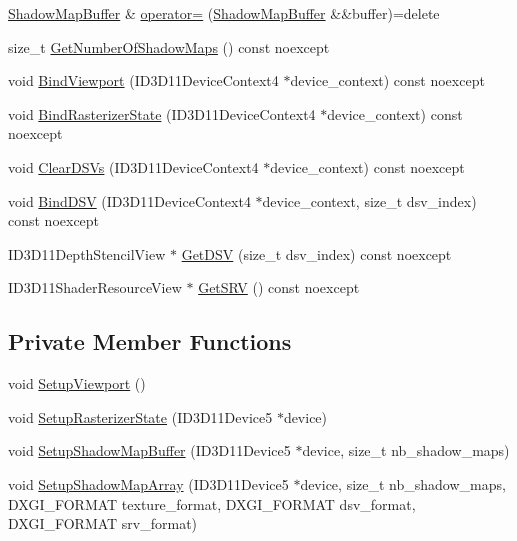 \begin{DoxyCompactItemize}
\item 
\hyperlink{structmage_1_1_shadow_map_buffer}{Shadow\+Map\+Buffer} \& \hyperlink{structmage_1_1_shadow_map_buffer_a7ecdf05195a56dbbfbe473df2aad6ba6}{operator=} (\hyperlink{structmage_1_1_shadow_map_buffer}{Shadow\+Map\+Buffer} \&\&buffer)=delete
\item 
size\+\_\+t \hyperlink{structmage_1_1_shadow_map_buffer_ab0b78c26663aa303d8f72dc89ec25eea}{Get\+Number\+Of\+Shadow\+Maps} () const noexcept
\item 
void \hyperlink{structmage_1_1_shadow_map_buffer_ae0d097c959ff2cdb2aabdd246c654039}{Bind\+Viewport} (I\+D3\+D11\+Device\+Context4 $\ast$device\+\_\+context) const noexcept
\item 
void \hyperlink{structmage_1_1_shadow_map_buffer_a4f71a1a486049ab2455af83f6a4c0f28}{Bind\+Rasterizer\+State} (I\+D3\+D11\+Device\+Context4 $\ast$device\+\_\+context) const noexcept
\item 
void \hyperlink{structmage_1_1_shadow_map_buffer_ac2e03bb5d33f5014d9ef66df401308d9}{Clear\+D\+S\+Vs} (I\+D3\+D11\+Device\+Context4 $\ast$device\+\_\+context) const noexcept
\item 
void \hyperlink{structmage_1_1_shadow_map_buffer_a8e23dccfa670bdb4a698977b7524434e}{Bind\+D\+SV} (I\+D3\+D11\+Device\+Context4 $\ast$device\+\_\+context, size\+\_\+t dsv\+\_\+index) const noexcept
\item 
I\+D3\+D11\+Depth\+Stencil\+View $\ast$ \hyperlink{structmage_1_1_shadow_map_buffer_a8762dcdaca36c7a206dac362d387f0f1}{Get\+D\+SV} (size\+\_\+t dsv\+\_\+index) const noexcept
\item 
I\+D3\+D11\+Shader\+Resource\+View $\ast$ \hyperlink{structmage_1_1_shadow_map_buffer_a3c923d6cea528af3420085fafd8f9f8e}{Get\+S\+RV} () const noexcept
\end{DoxyCompactItemize}
\subsection*{Private Member Functions}
\begin{DoxyCompactItemize}
\item 
void \hyperlink{structmage_1_1_shadow_map_buffer_aacabad92fb9c0bf81cf2f3c1fbae9f13}{Setup\+Viewport} ()
\item 
void \hyperlink{structmage_1_1_shadow_map_buffer_a4cc23df062cfc02ab1b0fdbe1f56161e}{Setup\+Rasterizer\+State} (I\+D3\+D11\+Device5 $\ast$device)
\item 
void \hyperlink{structmage_1_1_shadow_map_buffer_af1aa6aeab0c71dfd52b97fa7167cac17}{Setup\+Shadow\+Map\+Buffer} (I\+D3\+D11\+Device5 $\ast$device, size\+\_\+t nb\+\_\+shadow\+\_\+maps)
\item 
void \hyperlink{structmage_1_1_shadow_map_buffer_a1da4563b5dc84531f24df51e9e94e154}{Setup\+Shadow\+Map\+Array} (I\+D3\+D11\+Device5 $\ast$device, size\+\_\+t nb\+\_\+shadow\+\_\+maps, D\+X\+G\+I\+\_\+\+F\+O\+R\+M\+AT texture\+\_\+format, D\+X\+G\+I\+\_\+\+F\+O\+R\+M\+AT dsv\+\_\+format, D\+X\+G\+I\+\_\+\+F\+O\+R\+M\+AT srv\+\_\+format)
\end{DoxyCompactItemize}
